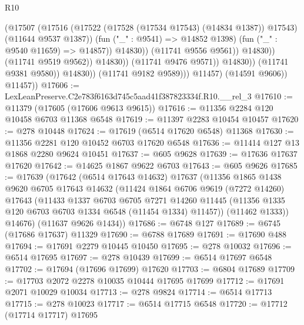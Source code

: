 \begin{lexlean}{R10}
\begin{coremodule}
                                            (@17507
                                              (@17516
                                                (@17522
                                                  (@17528 (@17534 @17543) (@14834 @1387))
                                                  @17543)
                                                (@11644 @9537 @1387))
                                              (fun ("_" : @9541) => @14852 @1398)
                                              (fun ("_" : @9540 @11659) => @14857))
                                            @14830))
                                        (@11741 @9556 @9561))
                                      @14830))
                                  (@11741 @9519 @9562))
                                @14830))
                            (@11741 @9476 @9571))
                          @14830))
                      (@11741 @9381 @9580))
                    @14830))
                (@11741 @9182 @9589)))
            @11457)
          (@14591 @9606))
        @11457))
@17606 := LexLeanPreserve.C2e783f6163d745c5aad41f387823334f.R10.__rel_3
@17610 := @11379 (@17605 (@17606 @9613 @9615))
@17616 := @11356 @2284 @120 @10458 @6703 @11368 @6548
@17619 := @11397 @2283 @10454 @10457
@17620 := @278 @10448
@17624 := @17619 (@6514 @17620 @6548) @11368
@17630 := @11356 @2281 @120 @10452 @6703 @17620 @6548
@17636 := @11414 @127 @13 @1868 @2280 @9624 @10451
@17637 := @605 @9628
@17639 := @17636 @17637 @17620
@17642 := @14625 @1867 @9622 @6703
@17643 := @605 @9626
@17685 := @17639
    (@17642
      (@6514 @17643 @14632)
      @17637
      (@11356
        @1865
        @1438
        @9620
        @6705
        @17643
        @14632
        (@11424
          @1864
          @6706
          @9619
          (@7272 @14260)
          @17643
          (@11433
            @1337
            @6703
            @6705
            @7271
            @14260
            @11445
            (@11356 @1335 @120 @6703 @6703 @1334 @6548 (@11454 @1334) @11457))
          (@11462 @1333))
        @14676)
      (@11637 @9626 @1434))
@17686 := @6748 @127
@17689 := @6745 (@17686 @17637) @11329
@17690 := @6788 @17689
@17691 := @17690 @488
@17694 := @17691 @2279 @10445 @10450
@17695 := @278 @10032
@17696 := @6514 @17695
@17697 := @278 @10439
@17699 := @6514 @17697 @6548
@17702 := @17694 (@17696 @17699) @17620
@17703 := @6804 @17689
@17709 := @17703 @2072 @2278 @10035 @10444 @17695 @17699
@17712 := @17691 @2071 @10029 @10034
@17713 := @278 @9824
@17714 := @6514 @17713
@17715 := @278 @10023
@17717 := @6514 @17715 @6548
@17720 := @17712 (@17714 @17717) @17695

\end{coremodule}
\end{lexlean}
